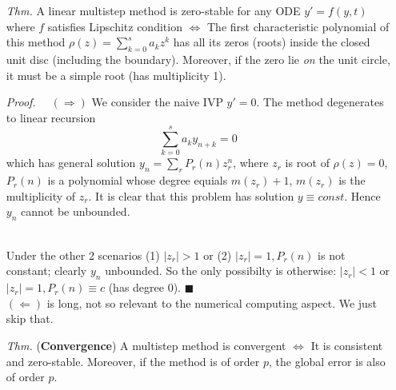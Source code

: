 \documentclass[a4paper, 11pt]{article}
\begin{document}
\begin{itemize}
	\item[\textit{Thm.}] A linear multistep method is zero-stable for any ODE $y'=f(y,t)$ where $f$ satisfies Lipschitz condition $\iff$ The first characteristic polynomial of this method $\rho(z)=\sum_{k=0}^s a_k z^k$ has all its zeros (roots) inside the closed unit disc (including the boundary). Moreover, if the zero lie \emph{on} the unit circle, it must be a simple root (has multiplicity 1). 

	\textit{Proof.~~} $(\Rightarrow)$ We consider the naive IVP $y'=0$. The method degenerates to linear recursion
	$$
	\sum_{k=0}^s a_k y_{n+k} = 0
	$$
	which has general solution $y_n =\sum_{r} P_r(n)z_r^n$, where $z_r$ is root of $\rho(z)=0$, $P_r(n)$ is a polynomial whose degree equials $m(z_r)+1$, $m(z_r)$ is the multiplicity of $z_r$. It is clear that this problem has solution $y\equiv const$. Hence $y_n$ cannot be unbounded.

	~\\
	Under the other 2 scenarios (1) $|z_r|>1$ or (2) $|z_r|=1, P_r(n)$ is not constant; clearly $y_n$ unbounded. So the only possibilty is otherwise: $|z_r|<1$ or $|z_r|=1, P_r(n)\equiv c$ (has degree 0). $\blacksquare$ \\
	$(\Leftarrow)$ is long, not so relevant to the numerical computing aspect. We just skip that.

	\item[\textit{Thm.}] (\textbf{Convergence}) A multistep method is convergent $\iff$ It is consistent and zero-stable. Moreover, if the method is of order $p$, the global error is also of order $p$.
\end{itemize}
\end{document}
